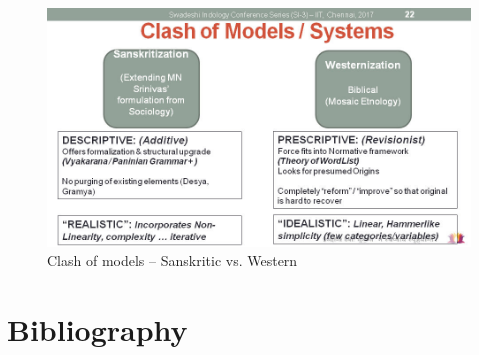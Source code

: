 \begin{figure}
\includegraphics[scale=0.3]{"images/article-02/art02-fig03.jpg"}
\caption{Clash of models – Sanskritic vs. Western}\label{art2-fig03}
\end{figure}


\section*{Bibliography}

